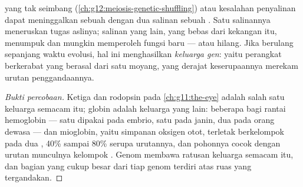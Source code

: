 \begin{proposition}\label{prop:g12:diversification-of-life:duplication}
 yang tak seimbang
(\cref{ch:g12:meiosis-genetic-shuffling}) atau kesalahan penyalinan
dapat meninggalkan sebuah  dengan dua salinan sebuah . Satu
salinannya meneruskan tugas aslinya; salinan yang lain, yang bebas dari
kekangan itu, menumpuk  dan mungkin memperoleh fungsi baru ---
atau hilang. Jika berulang sepanjang waktu evolusi, hal ini
menghasilkan \emph{keluarga gen}: yaitu perangkat
 berkerabat yang berasal dari satu moyang, yang derajat
keserupaannya merekam urutan penggandaannya.
\end{proposition}
\begin{proof}[Bukti percobaan]
Ketiga  dan rodopsin pada \cref{ch:g11:the-eye} adalah salah satu
keluarga semacam itu; globin adalah keluarga yang lain: beberapa 
bagi rantai hemoglobin --- satu dipakai pada embrio, satu pada janin,
dua pada orang dewasa --- dan  mioglobin, yaitu simpanan oksigen
otot, terletak berkelompok pada dua , 40\% sampai 80\% serupa
urutannya, dan pohonnya cocok dengan urutan munculnya kelompok
. Genom membawa ratusan keluarga semacam itu, dan bagian yang
cukup besar dari tiap genom terdiri atas ruas yang tergandakan.
\end{proof}

